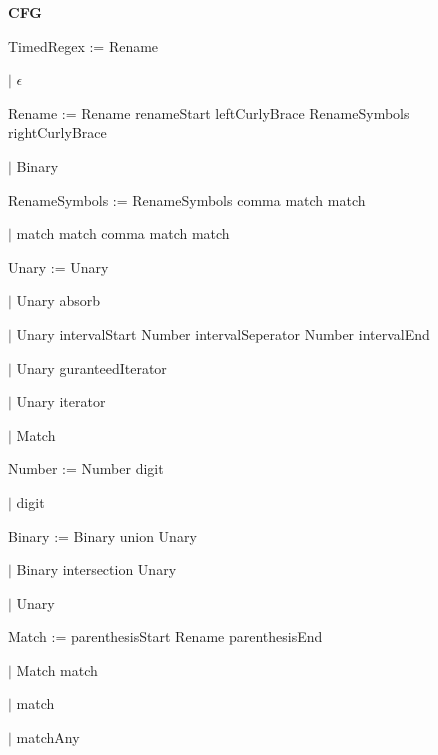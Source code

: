 
\textbf{CFG}

TimedRegex := Rename

\qquad	$\mid$ $\epsilon$

Rename := Rename renameStart leftCurlyBrace RenameSymbols rightCurlyBrace

\qquad $\mid$ Binary

RenameSymbols := RenameSymbols comma match match

\qquad $\mid$ match match comma match match

Unary := Unary

\qquad $\mid$ Unary absorb

\qquad $\mid$ Unary intervalStart Number intervalSeperator Number intervalEnd

\qquad $\mid$ Unary guranteedIterator

\qquad $\mid$ Unary iterator

\qquad $\mid$ Match

Number := Number digit

\qquad $\mid$ digit

Binary := Binary union Unary

\qquad $\mid$ Binary intersection Unary

\qquad $\mid$ Unary

Match := parenthesisStart Rename parenthesisEnd

\qquad $\mid$ Match match

\qquad $\mid$ match

\qquad $\mid$ matchAny

